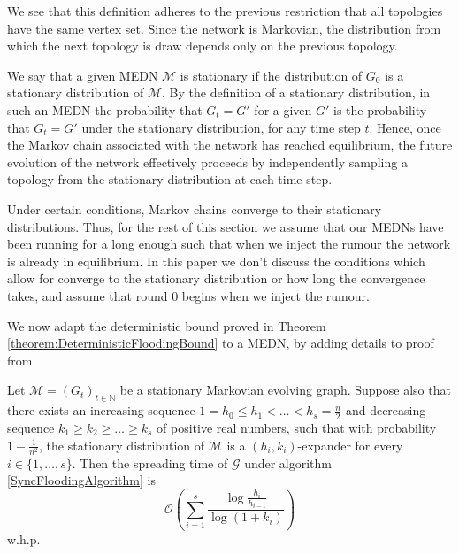 We see that this definition adheres to the previous restriction that all topologies have the same vertex set. Since the network is Markovian, the distribution from which the next topology is draw depends only on the previous topology.

We say that a given MEDN $\mathcal{M}$ is stationary if the distribution of $G_0$ is a stationary distribution of $\mathcal{M}$. By the definition of a stationary distribution, in such an MEDN the probability that $G_t = G'$ for a given $G'$ is the probability that $G_t = G'$ under the stationary distribution, for any time step $t$. Hence, once the Markov chain associated with the network has reached equilibrium, %
the future evolution of the network effectively proceeds by independently sampling a topology from the stationary distribution at each time step. %

Under certain conditions, Markov chains converge to their stationary distributions. Thus, for the rest of this section we assume that our MEDNs have been running for a long enough such that when we inject the rumour the network is already in equilibrium. In this paper we don't discuss the conditions which allow for converge to the stationary distribution or how long the convergence takes, and assume that round 0 begins when we inject the rumour.

We now adapt the deterministic bound proved in Theorem \ref{theorem:DeterministicFloodingBound} to a MEDN, by adding details to proof from \cite{syncPaper}


\begin{theorem}\label{theorem:markovSyncBound}
	Let $\mathcal{M} = (G_t)_{t \in \mathbb{N}}$  be a stationary Markovian evolving graph. Suppose also that there exists an increasing sequence $1 = h_0 \leq h_1 < \dots < h_s = \frac{n}{2}$ and decreasing sequence $k_1 \geq k_2 \geq \dots \geq k_s$ of positive real numbers, such that with probability $1-\frac{1}{n^2}$, the stationary distribution of $\mathcal{M}$ is a $(h_i, k_i)$-expander for every $i \in \{1, \dots , s\}$. Then the spreading time of $\mathcal{G}$ under algorithm \ref{SyncFloodingAlgorithm} is
	$$
		\mathcal{O}\left(\sum_{i=1}^s \frac{\log \frac{h_i}{h_{i-1}}}{\log(1+k_i)}\right)
	$$
	w.h.p.
\end{theorem}

